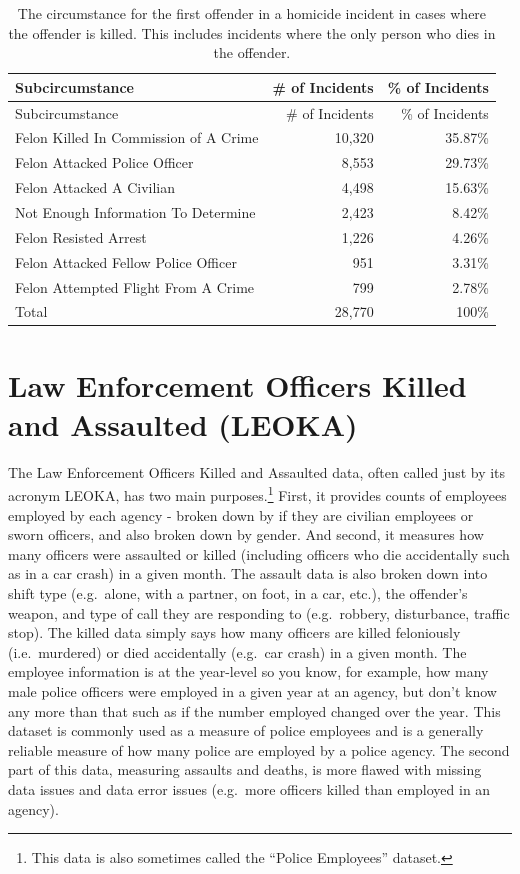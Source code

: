 \documentclass[
  12pt,
  openany]{book}
\begin{document}
\begin{longtable}[]{@{}lrr@{}}
\caption{\label{tab:shrSubCircumstance}The circumstance for the first offender in a homicide incident in cases where the offender is killed. This includes incidents where the only person who dies in the offender.}\tabularnewline
\toprule
Subcircumstance & \# of Incidents & \% of Incidents\tabularnewline
\midrule
\endfirsthead
\toprule
Subcircumstance & \# of Incidents & \% of Incidents\tabularnewline
\midrule
\endhead
Felon Killed In Commission of A Crime & 10,320 & 35.87\%\tabularnewline
Felon Attacked Police Officer & 8,553 & 29.73\%\tabularnewline
Felon Attacked A Civilian & 4,498 & 15.63\%\tabularnewline
Not Enough Information To Determine & 2,423 & 8.42\%\tabularnewline
Felon Resisted Arrest & 1,226 & 4.26\%\tabularnewline
Felon Attacked Fellow Police Officer & 951 & 3.31\%\tabularnewline
Felon Attempted Flight From A Crime & 799 & 2.78\%\tabularnewline
Total & 28,770 & 100\%\tabularnewline
\bottomrule
\end{longtable}

\hypertarget{leoka}{%
\chapter{Law Enforcement Officers Killed and Assaulted (LEOKA)}\label{leoka}}

The Law Enforcement Officers Killed and Assaulted data, often called just by its acronym LEOKA, has two main purposes.\footnote{This data is also sometimes called the ``Police Employees'' dataset.} First, it provides counts of employees employed by each agency - broken down by if they are civilian employees or sworn officers, and also broken down by gender. And second, it measures how many officers were assaulted or killed (including officers who die accidentally such as in a car crash) in a given month. The assault data is also broken down into shift type (e.g.~alone, with a partner, on foot, in a car, etc.), the offender's weapon, and type of call they are responding to (e.g.~robbery, disturbance, traffic stop). The killed data simply says how many officers are killed feloniously (i.e.~murdered) or died accidentally (e.g.~car crash) in a given month. The employee information is at the year-level so you know, for example, how many male police officers were employed in a given year at an agency, but don't know any more than that such as if the number employed changed over the year. This dataset is commonly used as a measure of police employees and is a generally reliable measure of how many police are employed by a police agency. The second part of this data, measuring assaults and deaths, is more flawed with missing data issues and data error issues (e.g.~more officers killed than employed in an agency).
\end{document}
